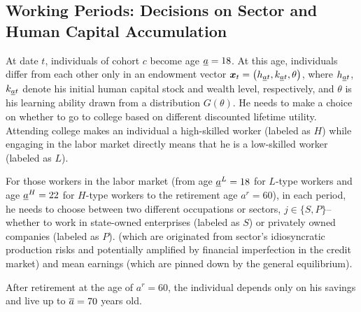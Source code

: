 \documentclass[12pt]{article}
\newcommand{\highlightR}[1]{{\color{MyRed}{#1}}}
\theoremstyle{definition}
\begin{document}
\begin{spacing}{1}
\subsection{Working Periods: Decisions on Sector and Human Capital Accumulation}

At date $t$, individuals of cohort $c$ become age $\underline{a}=18$. At this age, individuals differ from each other only in an endowment vector $\boldsymbol{x}_t = \left(h_{\underline{a}t}, k_{\underline{a}t}, \theta\right)$, where $h_{\underline{a}t}$, $k_{\underline{a}t}$ denote his initial human capital stock and wealth level, respectively, and $\theta$ is his learning ability drawn from a distribution $G(\theta)$. He needs to make a choice on whether to go to college based on different discounted lifetime utility. Attending college makes an individual a high-skilled worker (labeled as $H$) while engaging in the labor market directly means that he is a low-skilled worker (labeled as $L$). 

For those workers in the labor market (from age $\underline{a}^L = 18$ for $L$-type workers and age $\underline{a}^H = 22$ for $H$-type workers to the retirement age $a^{r} = 60$), in each period, he needs to choose between two different occupations or sectors, $j \in \{S, P\}$--whether to work in state-owned enterprises (labeled as $S$) or privately owned companies (labeled as $P$). \highlightR{From individuals' point of view, sectors differ from each other in the aspect of mean earnings and the idiosyncratic earning risks} (which are originated from sector's idiosyncratic production risks and potentially amplified by financial imperfection in the credit market) and mean earnings (which are pinned down by the general equilibrium). 

After retirement at the age of $a^r=60$, the individual depends only on his savings and live up to $\overline{a} = 70$ years old.


\end{spacing}
\end{document}
